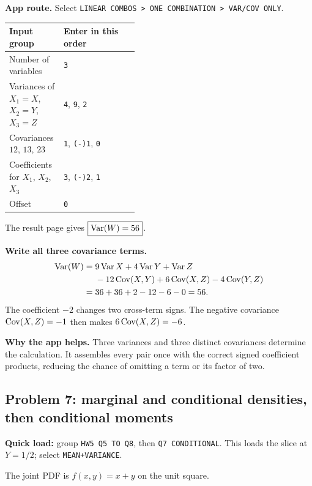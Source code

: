 \textbf{App route.} Select \texttt{LINEAR COMBOS > ONE COMBINATION > VAR/COV ONLY}.
\begin{center}
\begin{tabularx}{\linewidth}{@{}p{0.42\linewidth}X@{}}
\toprule Input group & Enter in this order\\\midrule
Number of variables & \texttt{3}\\
Variances of $X_1=X$, $X_2=Y$, $X_3=Z$ & \texttt{4}, \texttt{9}, \texttt{2}\\
Covariances $12$, $13$, $23$ & \texttt{1}, \texttt{(-)1}, \texttt{0}\\
Coefficients for $X_1$, $X_2$, $X_3$ & \texttt{3}, \texttt{(-)2}, \texttt{1}\\
Offset & \texttt{0}\\\bottomrule
\end{tabularx}
\end{center}
The result page gives $\boxed{\operatorname{Var}(W)=56}$.

\textbf{Write all three covariance terms.}
\[
\begin{aligned}
\operatorname{Var}(W)={}&9\operatorname{Var} X+4\operatorname{Var} Y+\operatorname{Var} Z\\
&-12\operatorname{Cov}(X,Y)+6\operatorname{Cov}(X,Z)-4\operatorname{Cov}(Y,Z)\\
={}&36+36+2-12-6-0=56.
\end{aligned}
\]
The coefficient $-2$ changes two cross-term signs. The negative covariance $\operatorname{Cov}(X,Z)=-1$ then makes $6\operatorname{Cov}(X,Z)=-6$.

\textbf{Why the app helps.} Three variances and three distinct covariances determine the calculation. It assembles every pair once with the correct signed coefficient products, reducing the chance of omitting a term or its factor of two.

\subsection{Problem 7: marginal and conditional densities, then conditional moments}
\textbf{Quick load:} group \texttt{HW5 Q5 TO Q8}, then \texttt{Q7 CONDITIONAL}. This loads the slice at $Y=1/2$; select \texttt{MEAN+VARIANCE}.

The joint PDF is $f(x,y)=x+y$ on the unit square.

